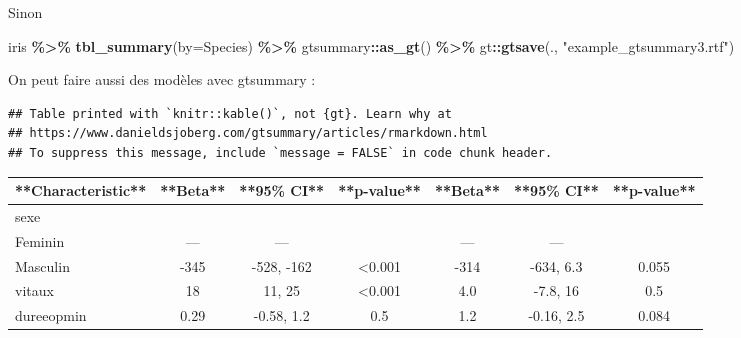 \documentclass[
]{book}
\newenvironment{Shaded}{\begin{snugshade}}{\end{snugshade}}
\newcommand{\AttributeTok}[1]{\textcolor[rgb]{0.13,0.29,0.53}{#1}}
\newcommand{\FunctionTok}[1]{\textcolor[rgb]{0.13,0.29,0.53}{\textbf{#1}}}
\newcommand{\NormalTok}[1]{#1}
\newcommand{\SpecialCharTok}[1]{\textcolor[rgb]{0.81,0.36,0.00}{\textbf{#1}}}
\newcommand{\StringTok}[1]{\textcolor[rgb]{0.31,0.60,0.02}{#1}}
\begin{document}
Sinon

\begin{Shaded}
\begin{Highlighting}[]
\NormalTok{iris }\SpecialCharTok{\%\textgreater{}\%} \FunctionTok{tbl\_summary}\NormalTok{(}\AttributeTok{by=}\NormalTok{Species) }\SpecialCharTok{\%\textgreater{}\%}
\NormalTok{  gtsummary}\SpecialCharTok{::}\FunctionTok{as\_gt}\NormalTok{() }\SpecialCharTok{\%\textgreater{}\%} 
\NormalTok{  gt}\SpecialCharTok{::}\FunctionTok{gtsave}\NormalTok{(., }\StringTok{"example\_gtsummary3.rtf"}\NormalTok{)}
\end{Highlighting}
\end{Shaded}

On peut faire aussi des modèles avec gtsummary :

\begin{Shaded}
\end{Shaded}

\begin{verbatim}
## Table printed with `knitr::kable()`, not {gt}. Learn why at
## https://www.danieldsjoberg.com/gtsummary/articles/rmarkdown.html
## To suppress this message, include `message = FALSE` in code chunk header.
\end{verbatim}

\begin{tabular}{l|c|c|c|c|c|c}
\hline
**Characteristic** & **Beta** & **95\% CI** & **p-value** & **Beta** & **95\% CI** & **p-value**\\
\hline
sexe &  &  &  &  &  & \\
\hline
Feminin & — & — &  & — & — & \\
\hline
Masculin & -345 & -528, -162 & <0.001 & -314 & -634, 6.3 & 0.055\\
\hline
vitaux & 18 & 11, 25 & <0.001 & 4.0 & -7.8, 16 & 0.5\\
\hline
dureeopmin & 0.29 & -0.58, 1.2 & 0.5 & 1.2 & -0.16, 2.5 & 0.084\\
\hline
\end{tabular}
\end{document}

